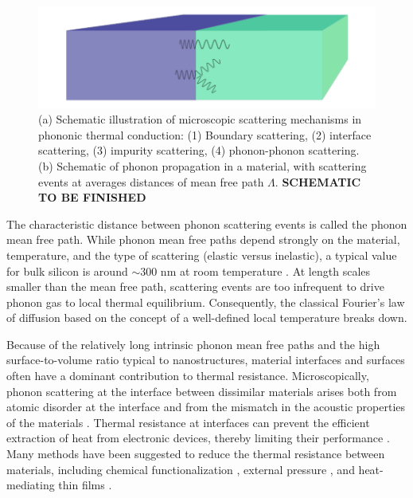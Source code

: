 \begin{figure}
\begin{center}
 \includegraphics[width=.80\columnwidth]{inkscape/interface.pdf}
 \caption{(a) Schematic illustration of microscopic scattering mechanisms in phononic thermal conduction: (1) Boundary scattering, (2) interface scattering, (3) impurity scattering, (4) phonon-phonon scattering. (b) Schematic of phonon propagation in a material, with scattering events at averages distances of mean free path $\Lambda$. \textbf{SCHEMATIC TO BE FINISHED}}
\label{fig:intro_scattering}
\end{center}
\end{figure}

The characteristic distance between phonon scattering events is called the phonon mean free path. While phonon mean free paths depend strongly on the material, temperature, and the type of scattering (elastic versus inelastic), a typical value for bulk silicon is around $\sim 300$ nm at room temperature \cite{ju99}. At length scales smaller than the mean free path, scattering events are too infrequent to drive phonon gas to local thermal equilibrium. Consequently, the classical Fourier's law of diffusion \cite{fourier} based on the concept of a well-defined local temperature breaks down. 

Because of the relatively long intrinsic phonon mean free paths and the high surface-to-volume ratio typical to nanostructures, material interfaces and surfaces often have a dominant contribution to thermal resistance. Microscopically, phonon scattering at the interface between dissimilar materials arises both from atomic disorder at the interface and from the mismatch in the acoustic properties of the materials \cite{}. Thermal resistance at interfaces can prevent the efficient extraction of heat from electronic devices, thereby limiting their performance \cite{pop10}. Many methods have been suggested to reduce the thermal resistance between materials, including chemical functionalization \cite{hopkins11,kaur14}, external pressure \cite{shen11,chalopin12}, and heat-mediating thin films \cite{english12}. 

